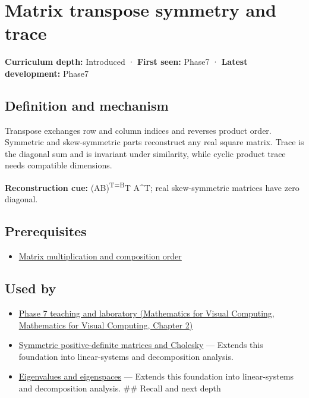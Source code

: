 \hypertarget{appendix-175ca5ff874d}{}\label{referencestart:appendix-175ca5ff874d}
\section{Matrix transpose symmetry and trace}\label{appendix-175ca5ff874d-matrix-transpose-symmetry-and-trace}

\textbf{Curriculum depth:} Introduced · \textbf{First seen:} Phase7 · \textbf{Latest development:} Phase7

\subsection{Definition and mechanism}\label{appendix-175ca5ff874d-definition-and-mechanism}

Transpose exchanges row and column indices and reverses product order. Symmetric and skew-symmetric parts reconstruct any real square matrix. Trace is the diagonal sum and is invariant under similarity, while cyclic product trace needs compatible dimensions.

\textbf{Reconstruction cue:} (AB)\textsuperscript{T=B}T A\^{}T; real skew-symmetric matrices have zero diagonal.

\subsection{Prerequisites}\label{appendix-175ca5ff874d-prerequisites}

\begin{itemize}
\tightlist
\item
  \hyperref[appendix-ab31ef447dbf]{Matrix multiplication and composition order}
\end{itemize}

\subsection{Used by}\label{appendix-175ca5ff874d-used-by}

\begin{itemize}
\tightlist
\item
  \href{../02-Mathematics-for-Visual-Computing/main.pdf\#nameddest=01-foundations-i-ch018-keep-the-promises-visible-while-moving-between-representations}{Phase 7 teaching and laboratory (Mathematics for Visual Computing, Mathematics for Visual Computing, Chapter 2)}
\item
  \hyperref[appendix-50d2ea3c9b26]{Symmetric positive-definite matrices and Cholesky} --- Extends this foundation into linear-systems and decomposition analysis.
\item
  \hyperref[appendix-0b3be18411f9]{Eigenvalues and eigenspaces} --- Extends this foundation into linear-systems and decomposition analysis. \#\# Recall and next depth
\end{itemize}

